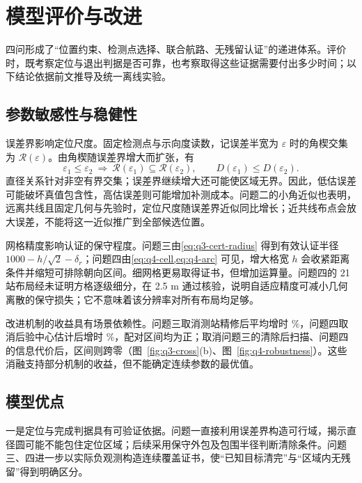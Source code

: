\section{模型评价与改进}\label{sec:evaluation}
四问形成了“位置约束、检测点选择、联合航路、无残留认证”的递进体系。评价时，既考察定位与退出判据是否可靠，也考察取得这些证据需要付出多少时间；以下结论依据前文推导及统一离线实验。

\subsection{参数敏感性与稳健性}
{\heiti 误差界影响定位尺度。}\songti 固定检测点与示向度读数，记误差半宽为 $\varepsilon$ 时的角楔交集为 $\mathcal R(\varepsilon)$。由角楔随误差界增大而扩张，有
\begin{equation}\label{eq:evaluation-error}
 \varepsilon_1\le\varepsilon_2
 \ \Longrightarrow\ 
 \mathcal R(\varepsilon_1)\subseteq\mathcal R(\varepsilon_2),\qquad
 D(\varepsilon_1)\le D(\varepsilon_2).
\end{equation}
直径关系针对非空有界交集；误差界继续增大还可能使区域无界。因此，低估误差可能破坏真值包含性，高估误差则可能增加补测成本。问题二的小角近似也表明，远离共线且固定几何与先验时，定位尺度随误差界近似同比增长；近共线布点会放大误差，不能将这一近似推广到全部候选位置。

{\heiti 网格精度影响认证的保守程度。}\songti 问题三由\cref{eq:q3-cert-radius} 得到有效认证半径 $1000-h/\sqrt2-\delta_r$；问题四由\cref{eq:q4-cell,eq:q4-arc} 可见，增大格宽 $h$ 会收紧距离条件并缩短可排除朝向区间。细网格更易取得证书，但增加运算量。问题四的 21 站布局经未证明方格逐级细分，在 2.5 m 通过核验，说明自适应精度可减小几何离散的保守损失；它不意味着该分辨率对所有布局均足够。

{\heiti 改进机制的收益具有场景依赖性。}\songti 问题三取消测站精修后平均增时 \QThreeAblationPolishIncrease\%，问题四取消后验中心估计后增时 \QFourPosteriorChange\%，配对区间均为正；取消问题三的清除后扫描、问题四的信息代价后，区间则跨零（图~\ref{fig:q3-cross}(b)、图~\ref{fig:q4-robustness}）。这些消融支持部分机制的收益，但不能确定连续参数的最优值。

\subsection{模型优点}
{\heiti 一是定位与完成判据具有可验证依据。}\songti 问题一直接利用误差界构造可行域，揭示直径圆可能不能包住定位区域；后续采用保守外包及包围半径判断清除条件。问题三、四进一步以实际负观测构造连续覆盖证书，使“已知目标清完”与“区域内无残留”得到明确区分。

